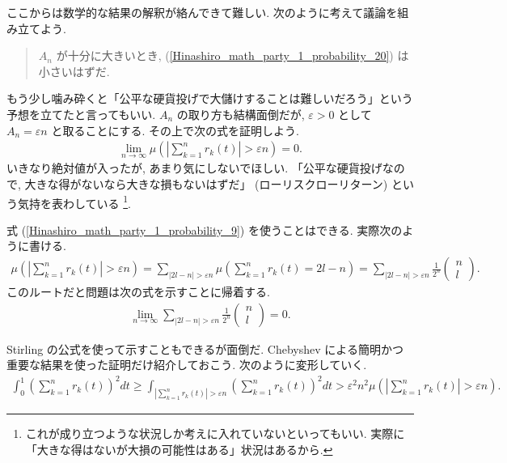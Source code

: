 \documentclass[openany, a4paper, oneside]{book}
\theoremstyle{break}
\theoremstyle{breakdefn}
\newcommand{\abs}[1]{\left|#1\right|}
\newcommand{\rbk}[1]{\left (#1\right)}
\newcommand{\limntoinfty}{\lim_{n \to \infty}}
\begin{document}
ここからは数学的な結果の解釈が絡んできて難しい.
次のように考えて議論を組み立てよう.
\begin{quote}
$A_n$ が十分に大きいとき, (\ref{Hinashiro_math_party_1_probability_20}) は小さいはずだ.
\end{quote}

もう少し噛み砕くと「公平な硬貨投げで大儲けすることは難しいだろう」という予想を立てたと言ってもいい.
$A_n$ の取り方も結構面倒だが, $\varepsilon > 0$ として $A_n = \varepsilon n$ と取ることにする.
その上で次の式を証明しよう.
\begin{align}
 \limntoinfty \mu \rbk{\abs{\sum_{k=1}^n r_k (t)} > \varepsilon n} = 0. \label{Hinashiro_math_party_1_probability_8}
\end{align}
いきなり絶対値が入ったが, あまり気にしないでほしい.
「公平な硬貨投げなので, 大きな得がないなら大きな損もないはずだ」 (ローリスクローリターン) という気持を表わしている \footnote{これが成り立つような状況しか考えに入れていないといってもいい.
実際に「大きな得はないが大損の可能性はある」状況はあるから.
 }.

式 (\ref{Hinashiro_math_party_1_probability_9}) を使うことはできる.
実際次のように書ける.
\begin{align}
 \mu \rbk{\abs{\sum_{k=1}^n r_k (t)} > \varepsilon n}
 =
 \sum_{\abs{2l - n} > \varepsilon n} \mu \rbk{\sum_{k=1}^n r_k (t) = 2l - n}
 =
 \sum_{\abs{2l - n} > \varepsilon n} \frac{1}{2^n}
 \begin{pmatrix}
  n \\
  l
 \end{pmatrix}.
\end{align}
このルートだと問題は次の式を示すことに帰着する.
\begin{align}
 \limntoinfty \sum_{\abs{2l - n} > \varepsilon n} \frac{1}{2^n}
 \begin{pmatrix}
  n \\
  l
 \end{pmatrix}
 = 0. \label{Hinashiro_math_party_1_probability_12}
\end{align}

Stirling の公式を使って示すこともできるが面倒だ.
Chebyshev による簡明かつ重要な結果を使った証明だけ紹介しておこう.
次のように変形していく.
\begin{align}
 \int_0^1 \rbk{\sum_{k=1}^n r_k (t)}^2 dt
 \geq
 \int_{\abs{\sum_{k=1}^n r_k (t)} > \varepsilon n} \rbk{\sum_{k=1}^n r_k (t)}^2 dt
 >
 \varepsilon^2 n^2 \mu \rbk{\abs{\sum_{k=1}^n r_k (t)} > \varepsilon n}.
\end{align}
\end{document}
